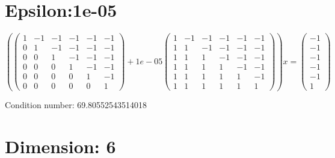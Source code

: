 \documentclass{article}%
\begin{document}
\section{Epsilon:1e{-}05}%
\label{sec:Epsilon1e{-}05}%
\[%
( \begin{pmatrix}%
1&-1&-1&-1&-1&-1\\%
0&1&-1&-1&-1&-1\\%
0&0&1&-1&-1&-1\\%
0&0&0&1&-1&-1\\%
0&0&0&0&1&-1\\%
0&0&0&0&0&1%
\end{pmatrix} + 1e{-}05 \begin{pmatrix}%
1&-1&-1&-1&-1&-1\\%
1&1&-1&-1&-1&-1\\%
1&1&1&-1&-1&-1\\%
1&1&1&1&-1&-1\\%
1&1&1&1&1&-1\\%
1&1&1&1&1&1%
\end{pmatrix} )x = \begin{pmatrix}%
-1\\%
-1\\%
-1\\%
-1\\%
-1\\%
1%
\end{pmatrix}%
\]%
\begin{Large}%
Condition number:%
69.80552543514018%
\end{Large}

%
\section{Dimension: 6}%
\label{sec:Dimension6}%
\end{document}
